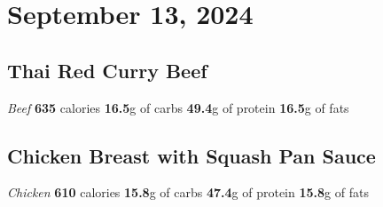 \documentclass{article}%
\begin{document}
\section*{September 13, 2024}%
\label{sec:September13,2024}%
\begin{paracol}[2]{2}%
\sloppy%
\subsection*{Thai Red Curry Beef}%
\label{subsec:ThaiRedCurryBeef}%
\textit{Beef}%
\newline%
\newline%
\textbf{635} calories%
\newline%
\textbf{16.5}g of carbs%
\newline%
\textbf{49.4}g of protein%
\newline%
\textbf{16.5}g of fats%
\newline%
\switchcolumn

%
\subsection*{Chicken Breast with Squash Pan Sauce}%
\label{subsec:ChickenBreastwithSquashPanSauce}%
\textit{Chicken}%
\newline%
\newline%
\textbf{610} calories%
\newline%
\textbf{15.8}g of carbs%
\newline%
\textbf{47.4}g of protein%
\newline%
\textbf{15.8}g of fats%
\newline%
\switchcolumn

%
\end{paracol}

%
\end{document}

